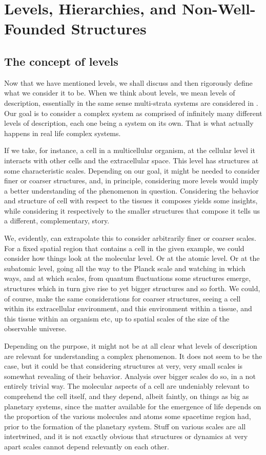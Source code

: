 \section{Levels, Hierarchies, and Non-Well-Founded Structures}

\subsection{The concept of levels}

Now that we have mentioned levels, we shall discuss and then rigorously define what we consider it to be. When we think about levels, we mean levels of description, essentially in the same sense multi-strata systems are considered in \cite{Mesarovic1970}. Our goal is to consider a complex system as comprised of infinitely many different levels of description, each one being a system on its own. That is what actually happens in real life complex systems. 

If we take, for instance, a cell in a multicellular organism, at the cellular level it interacts with other cells and the extracellular space. This level has structures at some characteristic scales. Depending on our goal, it might be needed to consider finer or coarser structures, and, in principle, considering more levels would imply a better understanding of the phenomenon in question. Considering the behavior and structure of cell with respect to the tissues it composes yields some insights, while considering it respectively to the smaller structures that compose it tells us a different, complementary, story. 

We, evidently, can extrapolate this to consider arbitrarily finer or coarser scales. For a fixed spatial region that contains a cell in the given example, we could consider how things look at the molecular level. Or at the atomic level. Or at the subatomic level, going all the way to the Planck scale and watching in which ways, and at which scales, from quantum fluctuations some structures emerge, structures which in turn give rise to yet bigger structures and so forth. We could, of course, make the same considerations for coarser structures, seeing a cell within its extracellular environment, and this environment within a tissue, and this tissue within an organism etc, up to spatial scales of the size of the observable universe. 

Depending on the purpose, it might not be at all clear what levels of description are relevant for understanding a complex phenomenon. It does not seem to be the case, but it could be that considering structures at very, very small scales is somewhat revealing of their behavior. Analysis over bigger scales do so, in a not entirely trivial way. The molecular aspects of a cell are undeniably relevant to comprehend the cell itself, and they depend, albeit faintly, on things as big as planetary systems, since the matter available for the emergence of life depends on the proportion of the various molecules and atoms some spacetime region had, prior to the formation of the planetary system. Stuff on various scales are all intertwined, and it is not exactly obvious that structures or dynamics at very apart scales cannot depend relevantly on each other. 

